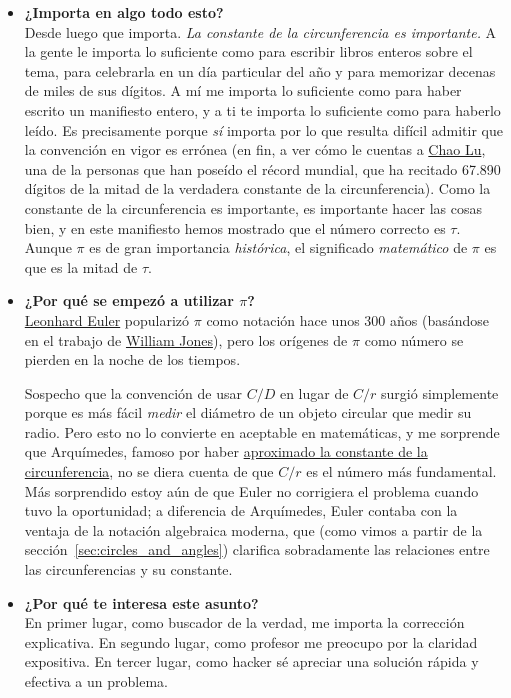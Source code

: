 \begin{itemize}
  \item \textbf{¿Importa en algo todo esto?} \\ Desde luego que importa. \emph{La constante de la circunferencia es importante.} A la gente le importa lo suficiente como para escribir libros enteros sobre el tema, para celebrarla en un día particular del año y para memorizar decenas de miles de sus dígitos. A mí me importa lo suficiente como para haber escrito un manifiesto entero, y a ti te importa lo suficiente como para haberlo leído. Es precisamente porque \emph{sí} importa por lo que resulta difícil admitir que la convención en vigor es errónea (en fin, a ver cómo le cuentas a \href{http://www.pi-world-ranking-list.com/lists/details/luchaointerview.html}{Chao Lu}, una de la personas que han poseído el récord mundial, que ha recitado 67.890 dígitos de la mitad de la verdadera constante de la circunferencia).
  Como la constante de la circunferencia es importante, es importante hacer las cosas bien, y en este manifiesto hemos mostrado que el número correcto es $\tau$. Aunque $\pi$ es de gran importancia \emph{histórica}, el significado \emph{matemático} de $\pi$ es que es la mitad de $\tau$.

  \item \textbf{¿Por qué se empezó a utilizar $\pi$?} \\ \href{https://es.wikipedia.org/wiki/Leonhard_Euler}{Leonhard Euler} popularizó $\pi$ como notación hace unos 300 años (basándose en el trabajo de \href{https://es.wikipedia.org/wiki/William_Jones_(matemático)}{William Jones}), pero los orígenes de $\pi$ como número se pierden en la noche de los tiempos.

Sospecho que la convención de usar $C/D$ en lugar de $C/r$ surgió simplemente porque es más fácil \emph{medir} el diámetro de un objeto circular que medir su radio. Pero esto no lo convierte en aceptable en matemáticas, y me sorprende que Arquímedes, famoso por haber \href{http://itech.fgcu.edu/faculty/clindsey/mhf4404/archimedes/archimedes.html}{aproximado la constante de la circunferencia}, no se diera cuenta de que $C/r$ es el número más fundamental. Más sorprendido estoy aún de que Euler no corrigiera el problema cuando tuvo la oportunidad; a diferencia de Arquímedes, Euler contaba con la ventaja de la notación algebraica moderna, que (como vimos a partir de la sección~\ref{sec:circles_and_angles}) clarifica sobradamente las relaciones entre las circunferencias y su constante.


  \item \textbf{¿Por qué te interesa este asunto?} \\ En primer lugar, como buscador de la verdad, me importa la corrección explicativa. En segundo lugar, como profesor me preocupo por la claridad expositiva. En tercer lugar, como hacker sé apreciar una solución rápida y efectiva a un problema.


\end{itemize}
